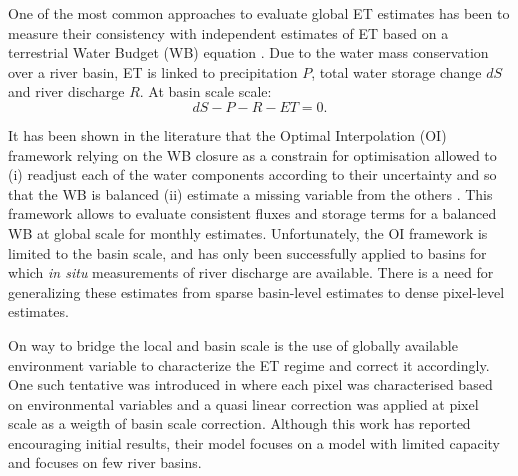 \documentclass[draft]{agujournal2019}
\begin{document}

One of the most common approaches to evaluate global ET estimates has been to measure their consistency with independent estimates of ET based on a terrestrial Water Budget (WB) equation \cite{Rodell2011a,Carter2018}. 
Due to the water mass conservation over a river basin, ET is linked to precipitation $P$, total water storage change $dS$ and river discharge $R$. 
At basin scale scale:
\begin{equation}
    dS-P-R-ET=0.
\end{equation}

It has been shown in the literature that the Optimal Interpolation (OI) framework relying on the WB closure as a constrain for optimisation allowed to 
(i) readjust each of the water components according to their uncertainty \cite{Sahoo2011,Pan2012,Rodell2015a,Aires2014, Pellet2019a} and so that the WB is balanced 
(ii) estimate a missing variable from the others \cite{Munier2014c,Pellet2020,Pellet2021c}. 
This framework allows to evaluate consistent fluxes and storage terms for a balanced WB at global \cite{Rodell2015a} scale for monthly estimates.
Unfortunately, the OI framework is limited to the basin scale, and has only been successfully applied to basins for which {\it in situ} measurements of river discharge are available. 
There is a need for generalizing these estimates from sparse basin-level estimates to dense pixel-level estimates. 

On way to bridge the local and basin scale is the use of globally available environment variable to characterize the ET regime and correct it accordingly. 
One such tentative was introduced in \cite{Munier2017} where each pixel was characterised based on environmental variables and a quasi linear correction was applied at pixel scale as a weigth of basin scale correction. 
Although this work has reported encouraging initial results, their model focuses on a model with limited capacity and focuses on few river basins.
\end{document}
